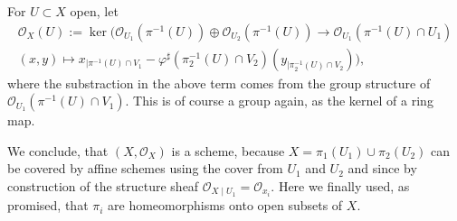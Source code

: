 \begin{exercise}{1}
\begin{enumerate}
{            For $U\subset X$ open, let 
            \begin{align*}
                \mathcal{O}_X(U):= \ker (\mathcal{O}_{U_1}(\pi^{-1}(U))\oplus
                \mathcal{O}_{U_2}(\pi^{-1}(U)) \to \mathcal{O}_{U_1}(\pi^{-1}(U)
                \cap U_1)\\ (x,y) \mapsto x_{\mid \pi^{-1}(U)\cap
                V_1}-\varphi^\sharp (\pi_2^{-1}(U)\cap V_2)(y_{\mid
                \pi_2^{-1}(U)\cap V_2}) ),
            \end{align*}
            where the substraction in the above term comes from the group
            structure of $\mathcal{O}_{U_1}(\pi^{-1}(U)\cap V_1)$. This is of
            course a group again, as the kernel of a ring map.

            We conclude, that $(X,\mathcal{O}_X)$ is a scheme, because
            $X=\pi_1(U_1)\cup \pi _2(U_2)$  can be covered by affine schemes
            using the cover from $U_1$ and $U_2$ and since by construction of
            the structure sheaf $\mathcal{O}_{X \mid U_1}=\mathcal{O}_{x_i}.$
            Here we finally used, as promised, that $\pi_i$ are homeomorphisms
            onto open subsets of $X$.
            }
    \end{enumerate}
   
\end{exercise}


